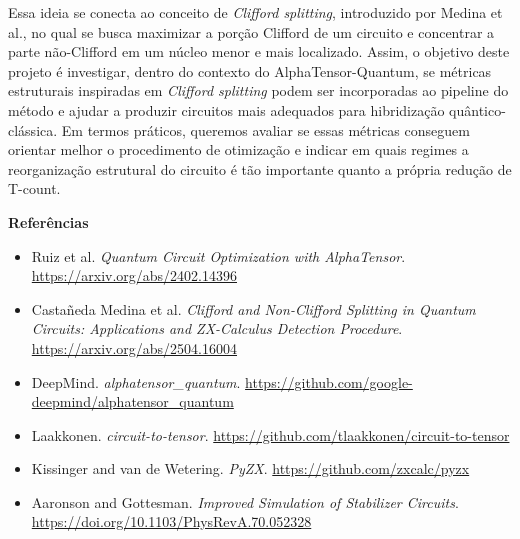 \documentclass[11pt,a4paper]{article}
\begin{document}
Essa ideia se conecta ao conceito de \emph{Clifford splitting}, introduzido por Medina et al., no qual se busca maximizar a porção Clifford de um circuito e concentrar a parte não-Clifford em um núcleo menor e mais localizado. Assim, o objetivo deste projeto é investigar, dentro do contexto do AlphaTensor-Quantum, se métricas estruturais inspiradas em \emph{Clifford splitting} podem ser incorporadas ao pipeline do método e ajudar a produzir circuitos mais adequados para hibridização quântico-clássica. Em termos práticos, queremos avaliar se essas métricas conseguem orientar melhor o procedimento de otimização e indicar em quais regimes a reorganização estrutural do circuito é tão importante quanto a própria redução de T-count.



\textbf{Referências}
\begin{itemize}
  \item Ruiz et al. \emph{Quantum Circuit Optimization with AlphaTensor}. \url{https://arxiv.org/abs/2402.14396}
  \item Castañeda Medina et al. \emph{Clifford and Non-Clifford Splitting in Quantum Circuits: Applications and ZX-Calculus Detection Procedure}. \url{https://arxiv.org/abs/2504.16004}
  \item DeepMind. \emph{alphatensor\_quantum}. \url{https://github.com/google-deepmind/alphatensor_quantum}
  \item Laakkonen. \emph{circuit-to-tensor}. \url{https://github.com/tlaakkonen/circuit-to-tensor}
  \item Kissinger and van de Wetering. \emph{PyZX}. \url{https://github.com/zxcalc/pyzx}
  \item Aaronson and Gottesman. \emph{Improved Simulation of Stabilizer Circuits}. \url{https://doi.org/10.1103/PhysRevA.70.052328}
\end{itemize}
\end{document}
